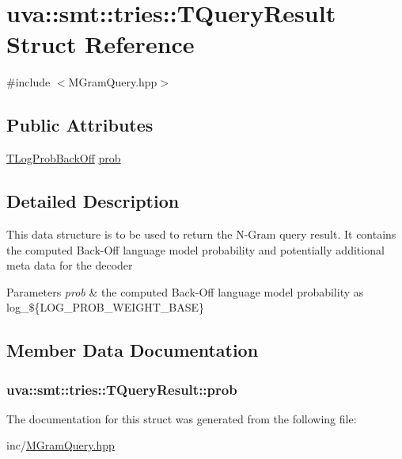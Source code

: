 \hypertarget{structuva_1_1smt_1_1tries_1_1_t_query_result}{}\section{uva\+:\+:smt\+:\+:tries\+:\+:T\+Query\+Result Struct Reference}
\label{structuva_1_1smt_1_1tries_1_1_t_query_result}


{\ttfamily \#include $<$M\+Gram\+Query.\+hpp$>$}

\subsection*{Public Attributes}
\begin{DoxyCompactItemize}
\item 
\hyperlink{namespaceuva_1_1smt_1_1tries_acd0660255dd9ef5d644f01de49102750}{T\+Log\+Prob\+Back\+Off} \hyperlink{structuva_1_1smt_1_1tries_1_1_t_query_result_af4096b2afbb3148f8bd0a5e5bcb0abb2}{prob}
\end{DoxyCompactItemize}


\subsection{Detailed Description}
This data structure is to be used to return the N-\/\+Gram query result. It contains the computed Back-\/\+Off language model probability and potentially additional meta data for the decoder 
\begin{DoxyParams}{Parameters}
{\em prob} & the computed Back-\/\+Off language model probability as log\+\_\+\$\{L\+O\+G\+\_\+\+P\+R\+O\+B\+\_\+\+W\+E\+I\+G\+H\+T\+\_\+\+B\+A\+S\+E\} \\
\hline
\end{DoxyParams}


\subsection{Member Data Documentation}
\hypertarget{structuva_1_1smt_1_1tries_1_1_t_query_result_af4096b2afbb3148f8bd0a5e5bcb0abb2}{}
\subsubsection[{prob}]{ uva\+::smt\+::tries\+::\+T\+Query\+Result\+::prob}\label{structuva_1_1smt_1_1tries_1_1_t_query_result_af4096b2afbb3148f8bd0a5e5bcb0abb2}


The documentation for this struct was generated from the following file\+:\begin{DoxyCompactItemize}
\item 
inc/\hyperlink{_m_gram_query_8hpp}{M\+Gram\+Query.\+hpp}\end{DoxyCompactItemize}
